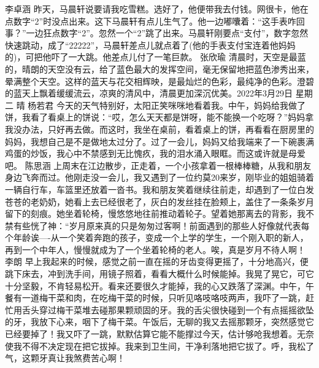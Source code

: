 {}李卓涵\markdownRendererInterblockSeparator
{}昨天，马晨轩说要请我吃雪糕。选好了，他便带我去付钱。网很卡，他在点数字“2”时没点出来。这下马晨轩有点儿生气了。他一边嘟囔着：“这手表咋回事？”一边狂点数字“2”。忽然一个“2”跳了出来。马晨轩刚要点“支付”，数字忽然快速跳动，成了“22222”，马晨轩差点儿就点着了(他的手表支付宝连着他妈妈的)，可把他吓了一大跳。他差点儿付了一笔巨款。\markdownRendererInterblockSeparator
{}\markdownRendererInterblockSeparator
{}张欣瑜\markdownRendererInterblockSeparator
{}清晨时，天空是最蓝的，晴朗的天空没有云，给了蓝色最大的发挥空间，毫无保留地把蓝色渗秀出来，晕满整个天空。这样的蓝天与花交相辉映，是最灿烂的色彩，最纯净的色彩。澄碧的蓝天上飘着缓缓流云，凉爽的清风中，清晨更加深沉优美。2022年3月29日 星期二 晴\markdownRendererInterblockSeparator
{}\markdownRendererInterblockSeparator
{}杨若君\markdownRendererInterblockSeparator
{}今天的天气特别好，太阳正笑咪咪地看着我。中午，妈妈给我做了饼，我看了看桌上的饼说：“哎，怎么天天都是饼呀，能不能换一个吃呀？”妈妈拿我没办法，只好再去做。而这时，我坐在桌前，看着桌上的饼，再看看在厨房里的妈妈，我想自己是不是做地太过分了。过了一会儿，妈妈又给我端来了一下碗裹满鸡蛋的炒饭，我心中不禁感到无比愧疚，我的泪水涌入眼眶。而这或许就是母爱吧。\markdownRendererInterblockSeparator
{}\markdownRendererInterblockSeparator
{}陈思涵\markdownRendererInterblockSeparator
{}上周末在江边散步，正走着，一个小孩拿着一根棒棒糖，从我和朋友身边飞奔而过。他刚走没一会儿，我又遇到了一位约莫20来岁，刚毕业的姐姐骑着一辆自行车，车篮里还放着一沓书。我和朋友笑着继续往前走，却遇到了一位白发苍苍的老奶奶，她看上去已经很老了，灰白的发丝挂在脸颊上，盖住了一条条岁月留下的刻痕。她坐着轮椅，慢悠悠地往前推动着轮子。望着她那离去的背影，我不禁有些恍了神：“岁月原来真的只是匆匆过客啊！前面遇到的那些人好像就代表每个年龄诶----从一个笑着奔跑的孩子，变成一个上学的学生，一个刚入职的新人，再到一个中年人，慢慢就成为了一个坐着轮椅的老人。唉，真是岁月不待人啊！\markdownRendererInterblockSeparator
{}\markdownRendererInterblockSeparator
{}李朗\markdownRendererInterblockSeparator
{}早上我起来的时候，感觉之前一直在摇的牙齿变得更摇了，十分地高兴，便跳下床去，冲到洗手间，用镜子照着，看看大概什么时候能掉。我晃了晃它，可它十分坚毅，不肯轻易松开。看来还要很久才能掉，我的心又跌落了深渊。中午，午餐有一道梅干菜和肉，在吃梅干菜的时候，只听见咯吱咯吱两声，我吓了一跳，赶忙用舌头穿过梅干菜堆去碰那果颗顽固的牙。我的舌尖很快碰到一个有点摇摇欲坠的牙，我放下心来，咽下了梅干菜。午饭后，无聊的我又去摇那颗牙，突然感觉它已经要掉了！我又吓了一跳，默默估算它能不能撑过今天，估计够呛我想着。无奈使我不得不决定现在把它拔掉。我来到卫生间，干净利落地把它拔了。呼，我松了气，这颗牙真让我煞费苦心啊！\markdownRendererInterblockSeparator
